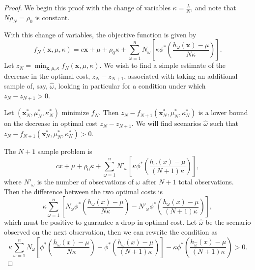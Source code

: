 \documentclass[ijoc,letterpaper]{informs3} %
\newcommand{\x}{\mathbf{x}}
\begin{document}
\begin{proof}
	We begin this proof with the change of variables $\kappa = \frac{\lambda}{N}$, and note that $N\rho_N = \rho_0$ is constant.
	
	With this change of variables, the objective function is given by
	\[
		f_N(\x,\mu,\kappa) = c\x + \mu + \rho_0 \kappa + \sum_{\omega = 1}^n N_\omega \left[ \kappa \phi^*\left(\frac{h_\omega(\x) - \mu}{N\kappa} \right) \right].
	\]
	Let $z_N = \min_{\x,\mu,\kappa} f_N(\x,\mu,\kappa)$.
	We wish to find a simple estimate of the decrease in the optimal cost, $z_N - z_{N+1}$, associated with taking an additional sample of, say, $\hat{\omega}$, looking in particular for a condition under which $z_N - z_{N+1} > 0$.
	
	Let $(\x^*_N,\mu^*_N,\kappa^*_N)$ minimize $f_N$.
	Then $z_N - f_{N+1}(\x^*_N,\mu^*_N,\kappa^*_N)$ is a lower bound on the decrease in optimal cost $z_N - z_{N+1}$.
	We will find scenarios $\hat{\omega}$ such that $z_N - f_{N+1}(\x^*_N,\mu^*_N,\kappa^*_N) > 0$.

	The $N+1$ sample problem is
	\[
		cx + \mu + \rho_0 \kappa + \sum_{\omega = 1}^n N'_\omega \left[ \kappa \phi^*\left(\frac{h_\omega(x) - \mu}{(N+1)\kappa} \right) \right],
	\]
	where $N'_\omega$ is the number of observations of $\omega$ after $N+1$ total observations.
	Then the difference between the two optimal costs is
	\[
		\kappa \sum_{\omega=1}^n \left[ N_\omega \phi^*\left(\frac{h_\omega(x) - \mu}{N\kappa} \right) - N'_\omega \phi^*\left(\frac{h_\omega(x) - \mu}{(N+1)\kappa} \right) \right],
	\]
	which must be positive to guarantee a drop in optimal cost.
	Let $\hat{\omega}$ be the scenario observed on the next observation, then we can rewrite the condition as
	\begin{equation} \label{eq:raw_cond}
		\kappa \sum_{\omega=1}^n N_\omega \left[ \phi^*\left(\frac{h_\omega(x) - \mu}{N\kappa} \right) - \phi^*\left(\frac{h_\omega(x) - \mu}{(N+1)\kappa} \right) \right] - \kappa \phi^*\left(\frac{h_{\hat{\omega}}(x) - \mu}{(N+1)\kappa}\right) > 0.
	\end{equation}


\end{proof}
\end{document}
